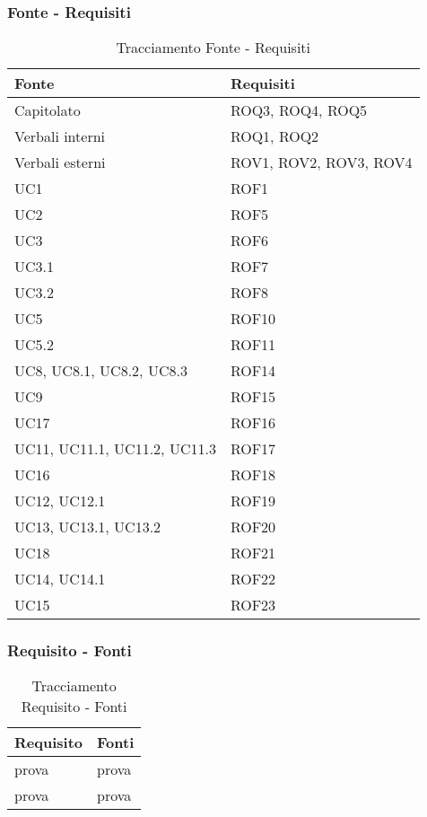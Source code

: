 \subsubsection{Fonte - Requisiti}
\begin{table}[h!]
    \centering
    \renewcommand{\arraystretch}{1.6} %
    \begin{tabularx}{0.8\textwidth}{|>{\centering\arraybackslash}p{2.8cm}|>{\centering\arraybackslash}X|} \hline
    \rowcolor[HTML]{FFD700} 
    \textbf{Fonte} & \textbf{Requisiti} \\ \hline
    Capitolato & ROQ3, ROQ4, ROQ5 \\ \hline
    Verbali interni & ROQ1, ROQ2 \\ \hline
    Verbali esterni & ROV1, ROV2, ROV3, ROV4 \\ \hline
    UC1 & ROF1 \\ \hline
    UC2 & ROF5 \\ \hline
    UC3 & ROF6 \\ \hline
    UC3.1 & ROF7 \\ \hline
    UC3.2 & ROF8 \\ \hline
    UC5 & ROF10 \\ \hline
    UC5.2 & ROF11 \\ \hline
    UC8, UC8.1, UC8.2, UC8.3 & ROF14 \\ \hline
    UC9 & ROF15 \\ \hline
    UC17 & ROF16 \\ \hline
    UC11, UC11.1, UC11.2, UC11.3 & ROF17 \\ \hline
    UC16 & ROF18 \\ \hline
    UC12, UC12.1 & ROF19 \\ \hline
    UC13, UC13.1, UC13.2 & ROF20 \\ \hline
    UC18 & ROF21 \\ \hline
    UC14, UC14.1 & ROF22 \\ \hline
    UC15 & ROF23 \\ \hline
    \end{tabularx}
    \caption{Tracciamento Fonte - Requisiti}
    \label{tab:Tracciamento_fonte_requisiti}
\end{table}


\subsubsection{Requisito - Fonti}
\begin{table}[h!]
    \centering
    \renewcommand{\arraystretch}{1.6} %
    \begin{tabularx}{0.8\textwidth}{|>{\centering\arraybackslash}p{2.8cm}|>{\centering\arraybackslash}X|} \hline
    \rowcolor[HTML]{FFD700} 
    \textbf{Requisito} & \textbf{Fonti} \\ \hline
    prova & prova \\ \hline
    prova & prova \\ \hline
    \end{tabularx}
    \caption{Tracciamento Requisito - Fonti}
    \label{tab:Tracciamento_requisiti_fonti}
\end{table}